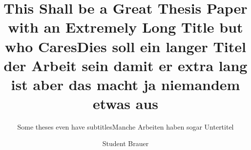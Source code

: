 \documentclass[%
    thesis=ma, %
    language=american, %
    paper=a4,%
    listings,
    online,
    final,
]{isw}
\title{This Shall be a Great Thesis Paper with an Extremely Long Title but who Cares}
\subtitle{Some theses even have subtitles}
\author{Student Brauer}
\begin{document}
    \frontmatter
    
    \maketitle
    
    \begin{otherlanguage}{ngerman}
        \title{Dies soll ein langer Titel der Arbeit sein damit er extra lang ist aber das macht ja niemandem etwas aus}
        \subtitle{Manche Arbeiten haben sogar Untertitel}
        \maketitle
    \end{otherlanguage}
    
    \begin{dedication}
        \lipsum[1]
    \end{dedication}
    
    
    \begin{thesis-abstract}
        \lipsum[1-3]
        
    \end{thesis-abstract}
    
    \tableofcontents
    \listoffigures
    \listoftables
    
    
    \listoftodos
    
    \mainmatter
    
    
    
    \begin{appendices}
        
    \end{appendices}
    
    
    
\end{document}
